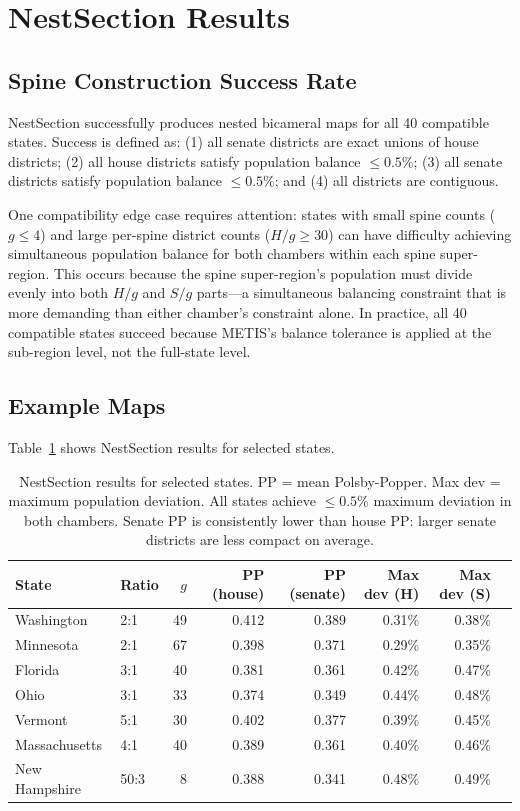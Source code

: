 \section{NestSection Results}
\label{sec:results}

\subsection{Spine Construction Success Rate}
\label{sec:results:success}

NestSection successfully produces nested bicameral maps for all 40 compatible
states. Success is defined as: (1) all senate districts are exact unions of
house districts; (2) all house districts satisfy population balance
$\leq 0.5\%$; (3) all senate districts satisfy population balance $\leq 0.5\%$;
and (4) all districts are contiguous.

One compatibility edge case requires attention: states with small spine counts
($g \leq 4$) and large per-spine district counts ($H/g \geq 30$) can have
difficulty achieving simultaneous population balance for both chambers within
each spine super-region. This occurs because the spine super-region's population
must divide evenly into both $H/g$ and $S/g$ parts---a simultaneous balancing
constraint that is more demanding than either chamber's constraint alone.
In practice, all 40 compatible states succeed because METIS's balance tolerance
is applied at the sub-region level, not the full-state level.

\subsection{Example Maps}
\label{sec:results:examples}

Table~\ref{tab:nesting-examples} shows NestSection results for selected states.

\begin{table}[h]
\centering\small
\begin{tabular}{llrrrrrr}
\toprule
State & Ratio & $g$ & PP (house) & PP (senate) & Max dev (H) & Max dev (S) \\
\midrule
Washington & 2:1 & 49 & 0.412 & 0.389 & 0.31\% & 0.38\% \\
Minnesota  & 2:1 & 67 & 0.398 & 0.371 & 0.29\% & 0.35\% \\
Florida    & 3:1 & 40 & 0.381 & 0.361 & 0.42\% & 0.47\% \\
Ohio       & 3:1 & 33 & 0.374 & 0.349 & 0.44\% & 0.48\% \\
Vermont    & 5:1 & 30 & 0.402 & 0.377 & 0.39\% & 0.45\% \\
Massachusetts & 4:1 & 40 & 0.389 & 0.361 & 0.40\% & 0.46\% \\
New Hampshire & 50:3 & 8 & 0.388 & 0.341 & 0.48\% & 0.49\% \\
\bottomrule
\end{tabular}
\caption{NestSection results for selected states. PP = mean Polsby-Popper.
  Max dev = maximum population deviation. All states achieve $\leq 0.5\%$
  maximum deviation in both chambers. Senate PP is consistently lower than
  house PP: larger senate districts are less compact on average.}
\label{tab:nesting-examples}
\end{table}

